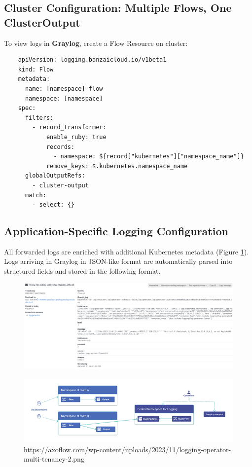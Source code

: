 \documentclass[../main.tex]{subfiles}
\begin{document}
\subsection{Cluster Configuration: Multiple Flows, One ClusterOutput}

To view logs in \textbf{Graylog}, create a Flow Resource on cluster:

\begin{verbatim}
    apiVersion: logging.banzaicloud.io/v1beta1
    kind: Flow
    metadata:
      name: [namespace]-flow
      namespace: [namespace]
    spec:
      filters:
        - record_transformer:
            enable_ruby: true
            records:
              - namespace: ${record["kubernetes"]["namespace_name"]}
            remove_keys: $.kubernetes.namespace_name
      globalOutputRefs:
        - cluster-output
      match:
        - select: {}
\end{verbatim}

\subsection{Application-Specific Logging Configuration}

All forwarded logs are enriched with additional Kubernetes metadata (Figure \ref{fig:message}). Logs arriving in Graylog in JSON-like format are automatically parsed into structured fields and stored in the following format.

\begin{figure}[h]
        \centering
        \includegraphics[scale=0.6]{img/2-background/centralized_logging/message.png}
        \caption{ }
        \label{fig:message}
\end{figure}


\begin{figure}[h]
        \centering
        \includegraphics[]{img/2-background/centralized_logging/log_operator_flows.png}
        \caption{https://axoflow.com/wp-content/uploads/2023/11/logging-operator-multi-tenancy-2.png }
        \label{fig:log_operator_flows}
\end{figure}
\end{document}
